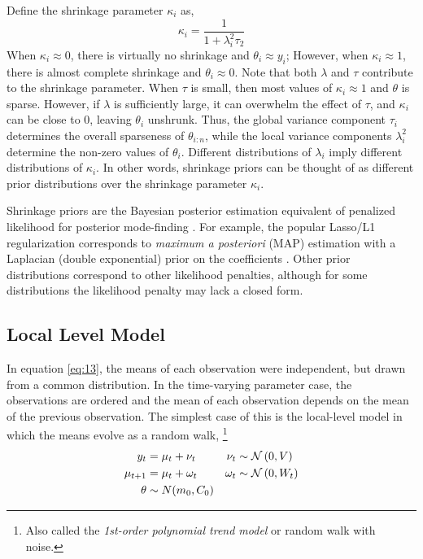 \documentclass{article}
\begin{document}
Define the shrinkage parameter $\kappa_{i}$ as,
\begin{equation}
  \label{eq:19}
  \kappa_{i} = \frac{1}{1 + \lambda^{2}_{i} \tau_{2}}
\end{equation}
When $\kappa_{i} \approx 0$, there is virtually no shrinkage and $\theta_{i} \approx y_{i}$;
However, when $\kappa_{i} \approx 1$, there is almost complete shrinkage and $\theta_{i} \approx 0$.
Note that both $\lambda$ and $\tau$ contribute to the shrinkage parameter.
When $\tau$ is small, then most values of $\kappa_{i} \approx 1$ and $\theta$ is sparse.
However, if $\lambda$ is sufficiently large, it can overwhelm the effect of $\tau$, and $\kappa_{i}$ can be close to 0, leaving $\theta_{i}$ unshrunk.
Thus, the global variance component $\tau_{i}$ determines the overall sparseness of $\theta_{i:n}$, while the local variance components $\lambda_{i}^{2}$ determine the non-zero values of $\theta_{i}$.
Different distributions of $\lambda_{i}$ imply different distributions of $\kappa_{i}$.
In other words, shrinkage priors can be thought of as different prior distributions over the shrinkage parameter $\kappa_{i}$.

Shrinkage priors are the Bayesian posterior estimation equivalent of penalized likelihood for posterior mode-finding \parencites{PolsonScott2010}{PolsonScott2012a}.
For example, the popular Lasso/L1 regularization \parencite{Tibshirani1996} corresponds to \textit{maximum a posteriori} (MAP) estimation with a Laplacian (double exponential) prior on the coefficients \parencites{ParkCasella2008}{Hans2009}.
Other prior distributions correspond to other likelihood penalties, although for some distributions the likelihood penalty may lack a closed form.

\subsection{Local Level Model}
\label{sec:local-level-model}

In equation \ref{eq:13}, the means of each observation were independent, but drawn from a common distribution.
In the time-varying parameter case, the observations are ordered and the mean of each observation depends on the mean of the previous observation.
The simplest case of this is the local-level model in which the means evolve as a random walk,
\footnote{Also called the \textit{1st-order polynomial trend model} \parencite[Chapter 2]{WestHarrison1997} or random walk with noise.}
\begin{equation}
  \label{eq:5}
  \begin{aligned}[t]
    y_{t} &= \mu_{t} + \nu_{t} & \nu_{t} & \sim \mathcal{N}\left(0, V\right) \\
    \mu_{t + 1} &= \mu_{t} + \omega_{t} & \omega_{t} & \sim \mathcal{N}\left(0, W_{t}\right) \\
    \theta & \sim N(m_{0}, C_{0})
  \end{aligned}
\end{equation}
\end{document}
